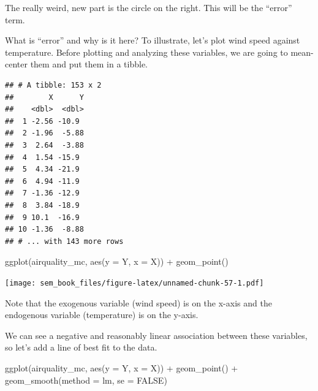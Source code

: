 \documentclass[
]{book}
\newenvironment{Shaded}{\begin{snugshade}}{\end{snugshade}}
\newcommand{\AttributeTok}[1]{\textcolor[rgb]{0.77,0.63,0.00}{#1}}
\newcommand{\ConstantTok}[1]{\textcolor[rgb]{0.00,0.00,0.00}{#1}}
\newcommand{\FunctionTok}[1]{\textcolor[rgb]{0.00,0.00,0.00}{#1}}
\newcommand{\NormalTok}[1]{#1}
\newcommand{\OtherTok}[1]{\textcolor[rgb]{0.56,0.35,0.01}{#1}}
\newcommand{\SpecialCharTok}[1]{\textcolor[rgb]{0.00,0.00,0.00}{#1}}
\begin{document}
The really weird, new part is the circle on the right. This will be the ``error'' term.

What is ``error'' and why is it here? To illustrate, let's plot wind speed against temperature. Before plotting and analyzing these variables, we are going to mean-center them and put them in a tibble.

\begin{Shaded}
\end{Shaded}

\begin{verbatim}
## # A tibble: 153 x 2
##        X      Y
##    <dbl>  <dbl>
##  1 -2.56 -10.9 
##  2 -1.96  -5.88
##  3  2.64  -3.88
##  4  1.54 -15.9 
##  5  4.34 -21.9 
##  6  4.94 -11.9 
##  7 -1.36 -12.9 
##  8  3.84 -18.9 
##  9 10.1  -16.9 
## 10 -1.36  -8.88
## # ... with 143 more rows
\end{verbatim}

\begin{Shaded}
\begin{Highlighting}[]
\FunctionTok{ggplot}\NormalTok{(airquality\_mc, }\FunctionTok{aes}\NormalTok{(}\AttributeTok{y =}\NormalTok{ Y, }\AttributeTok{x =}\NormalTok{ X)) }\SpecialCharTok{+}
    \FunctionTok{geom\_point}\NormalTok{()}
\end{Highlighting}
\end{Shaded}

\texttt{[image: sem\_book\_files/figure-latex/unnamed-chunk-57-1.pdf]}

Note that the exogenous variable (wind speed) is on the x-axis and the endogenous variable (temperature) is on the y-axis.

We can see a negative and reasonably linear association between these variables, so let's add a line of best fit to the data.

\begin{Shaded}
\begin{Highlighting}[]
\FunctionTok{ggplot}\NormalTok{(airquality\_mc, }\FunctionTok{aes}\NormalTok{(}\AttributeTok{y =}\NormalTok{ Y, }\AttributeTok{x =}\NormalTok{ X)) }\SpecialCharTok{+}
    \FunctionTok{geom\_point}\NormalTok{() }\SpecialCharTok{+}
    \FunctionTok{geom\_smooth}\NormalTok{(}\AttributeTok{method =}\NormalTok{ lm, }\AttributeTok{se =} \ConstantTok{FALSE}\NormalTok{)}
\end{Highlighting}
\end{Shaded}
\end{document}
